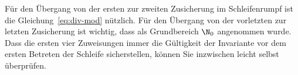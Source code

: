 
Für den Übergang von der ersten zur zweiten Zusicherung im
Schleifenrumpf ist die Gleichung~\ref{eq:div-mod} nützlich.
%
Für den Übergang von der vorletzten zur letzten Zusicherung ist
wichtig, dass als Grundbereich $\N_0$ angenommen wurde.
%
Dass die ersten vier Zuweisungen immer die Gültigkeit der Invariante
vor dem ersten Betreten der Schleife sicherstellen, können Sie
inzwischen leicht selbst überprüfen.

